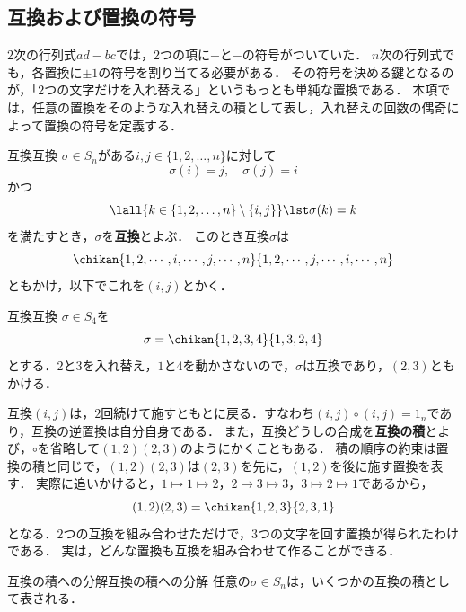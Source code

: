 \subsection{互換および置換の符号}

$2$次の行列式$ad - bc$では，$2$つの項に$+$と$-$の符号がついていた．
$n$次の行列式でも，各置換に$\pm 1$の符号を割り当てる必要がある．
その符号を決める鍵となるのが，「$2$つの文字だけを入れ替える」というもっとも単純な置換である．
本項では，任意の置換をそのような入れ替えの積として表し，入れ替えの回数の偶奇によって置換の符号を定義する．


\begin{definition}{互換}{互換}
  $\sigma \in S_n$がある$i, j \in \{1, 2, \dots, n\}$に対して
  \[
  \sigma(i) = j, \quad \sigma(j) = i
  \]
  かつ
  \[
  \lall{k \in \{1, 2, \dots, n\} \setminus \{i, j\}} \lst \sigma(k) = k
  \]
  を満たすとき，$\sigma$を\textbf{互換}とよぶ． このとき互換$\sigma$は
  \[
  \chikan{1, 2, \cdots, i, \cdots, j, \cdots, n}{1, 2, \cdots, j, \cdots, i, \cdots, n}
  \]
  ともかけ，以下でこれを$(i,j)$とかく．
\end{definition}

\begin{example}{互換}{互換}
  $\sigma \in S_4$を
  \[
  \sigma = \chikan{1, 2, 3, 4}{1, 3, 2, 4}
  \]
  とする．$2$と$3$を入れ替え，$1$と$4$を動かさないので，$\sigma$は互換であり，$(2,3)$ともかける．
\end{example}

互換$(i, j)$は，$2$回続けて施すともとに戻る．すなわち$(i, j) \circ (i, j) = 1_n$であり，互換の逆置換は自分自身である．
また，互換どうしの合成を\textbf{互換の積}とよび，$\circ$を省略して$(1,2)(2,3)$のようにかくこともある．
積の順序の約束は置換の積と同じで，$(1,2)(2,3)$は$(2,3)$を先に，$(1,2)$を後に施す置換を表す．
実際に追いかけると，$1 \mapsto 1 \mapsto 2$，$2 \mapsto 3 \mapsto 3$，$3 \mapsto 2 \mapsto 1$であるから，
\[
  (1,2)(2,3) = \chikan{1, 2, 3}{2, 3, 1}
\]
となる．$2$つの互換を組み合わせただけで，$3$つの文字を回す置換が得られたわけである．
実は，どんな置換も互換を組み合わせて作ることができる．

\begin{prop}{互換の積への分解}{互換の積への分解}
  任意の$\sigma \in S_n$は，いくつかの互換の積として表される．
\end{prop}


